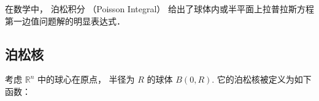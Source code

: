 
\begin{issues}
\issueDraft
\end{issues}

在数学中， 泊松积分 （Poisson Integral） 给出了球体内或半平面上拉普拉斯方程第一边值问题解的明显表达式．

\subsection{泊松核}
考虑 $\mathbb{R}^n$ 中的球心在原点， 半径为 $R$ 的球体 $B(0,R)$. 它的泊松核被定义为如下函数：
